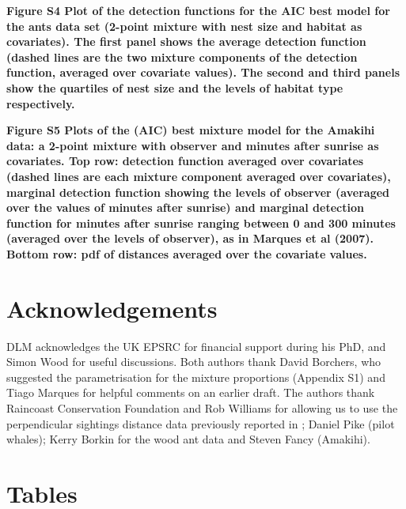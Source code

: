 \documentclass[10pt]{article}
\begin{document}
\textbf{Figure S4 Plot of the detection functions for the AIC best model for the ants data set (2-point mixture with nest size and habitat as covariates). The first panel shows the average detection function (dashed lines are the two mixture components of the detection function, averaged over covariate values). The second and third panels show the quartiles of nest size and the levels of habitat type respectively.}

\textbf{Figure S5 Plots of the (AIC) best mixture model for the Amakihi data: a 2-point mixture with observer and minutes after sunrise as covariates. Top row: detection function averaged over covariates (dashed lines are each mixture component averaged over covariates), marginal detection function showing the levels of observer (averaged over the values of minutes after sunrise) and marginal detection function for minutes after sunrise ranging between 0 and 300 minutes (averaged over the levels of observer), as in Marques et al (2007). Bottom row: pdf of distances averaged over the covariate values.}


\section*{Acknowledgements}

DLM acknowledges the UK EPSRC for financial support during his PhD, and Simon Wood for useful discussions.  Both authors thank David Borchers, who suggested the parametrisation for the mixture proportions (Appendix S1) and Tiago Marques for helpful comments on an earlier draft. The authors thank Raincoast Conservation Foundation and Rob Williams for allowing us to use the perpendicular sightings distance data previously reported in \cite{Williams:2007tc}; Daniel Pike (pilot whales); Kerry Borkin for the wood ant data and Steven Fancy (Amakihi).



\section*{Tables}
\end{document}
